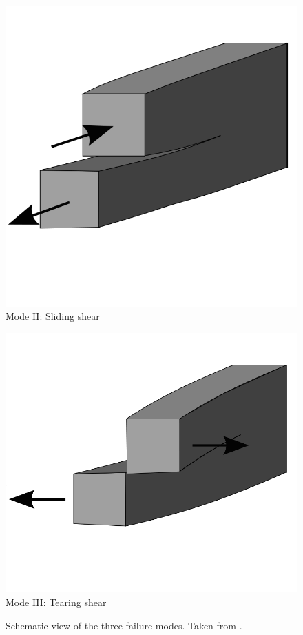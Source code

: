\documentclass[cmfonts]{witpress}
\begin{document}
\begin{figure}
\begin{minipage}[b]{.3\columnwidth}
	\centering
	\includegraphics[width=\columnwidth]{figures/IMG_CUTRES/wikipedia_failure_modes_2}
			Mode II: Sliding shear
\end{minipage}
\hfill
\begin{minipage}[b]{.3\columnwidth}
	\centering
	\includegraphics[width=\columnwidth]{figures/IMG_CUTRES/wikipedia_failure_modes_3}
			Mode III: Tearing shear
\end{minipage}
	\caption[Schematic view of the three failure modes.]{Schematic view of the three failure modes. Taken from \cite{wiki_fracture_modes}.}
	\label{fig:wikipedia_failure_modes}
\end{figure}
\end{document}

